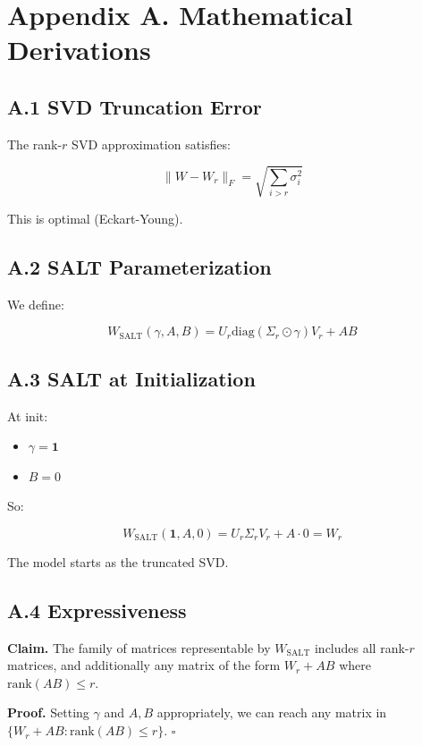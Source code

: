 
\section{Appendix A. Mathematical Derivations}

\subsection{A.1 SVD Truncation Error}

The rank-$r$ SVD approximation satisfies:

\[
\|W - W_r\|_F = \sqrt{\sum_{i > r} \sigma_i^2}
\tag{A.1}
\]

This is optimal (Eckart-Young).

\subsection{A.2 SALT Parameterization}

We define:

\[
W_\text{SALT}(\gamma, A, B) = U_r \text{diag}(\Sigma_r \odot \gamma) V_r + AB
\tag{A.2}
\]

\subsection{A.3 SALT at Initialization}

At init:

\begin{itemize}
\item $\gamma = \mathbf{1}$
\item $B = 0$

\end{itemize}
So:

\[
W_\text{SALT}(\mathbf{1}, A, 0) = U_r \Sigma_r V_r + A \cdot 0 = W_r
\tag{A.3}
\]

The model starts as the truncated SVD.

\subsection{A.4 Expressiveness}

\textbf{Claim.} The family of matrices representable by $W_\text{SALT}$ includes 
all rank-$r$ matrices, and additionally any matrix of the form 
$W_r + AB$ where $\text{rank}(AB) \leq r$.

\textbf{Proof.} Setting $\gamma$ and $A, B$ appropriately, we can reach any 
matrix in $\{W_r + AB : \text{rank}(AB) \leq r\}$. $\square$

